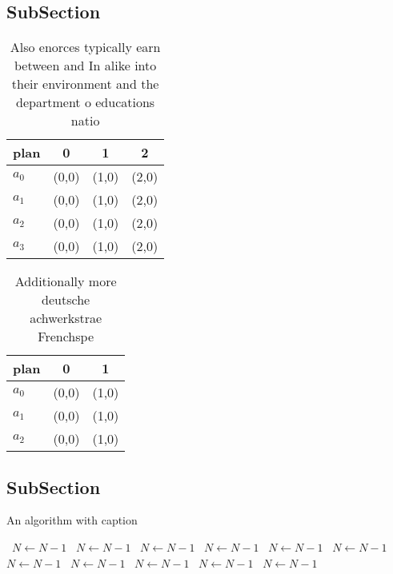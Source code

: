 \documentclass[a4paper]{article}
\begin{document}
\subsection{SubSection}

\begin{table}
\begin{adjustbox}{width=0.9\columnwidth}
\begin{tabular}{|l|l|l|l|}
\hline
\textbf{plan} & \multicolumn{1}{c|}{\textbf{0}} & \multicolumn{1}{c|}{\textbf{1}} & \multicolumn{1}{c|}{\textbf{2}} \\ \hline
\textbf{$a_0$}  & (0,0) & (1,0) & (2,0) \\ \hline
\textbf{$a_1$}  & (0,0) & (1,0) & (2,0) \\ \hline
\textbf{$a_2$}  & (0,0) & (1,0) & (2,0) \\ \hline
\textbf{$a_3$}  & (0,0) & (1,0) & (2,0) \\ \hline
\end{tabular}
\end{adjustbox}
\caption{Also enorces typically earn between and In alike into their environment and the department o educations natio
}
\end{table}

\begin{table}
\begin{adjustbox}{width=1\columnwidth}
\begin{tabular}{|l|l|l|}
\hline
\textbf{plan} & \multicolumn{1}{c|}{\textbf{0}} & \multicolumn{1}{c|}{\textbf{1}} \\ \hline
\textbf{$a_0$}  & (0,0) & (1,0) \\ \hline
\textbf{$a_1$}  & (0,0) & (1,0) \\ \hline
\textbf{$a_2$}  & (0,0) & (1,0) \\ \hline
\end{tabular}
\end{adjustbox}
\caption{Additionally more deutsche achwerkstrae Frenchspe
}
\end{table}

\subsection{SubSection}

\begin{algorithm}
\caption{An algorithm with caption}
\begin{algorithmic}
\    \State $N \gets N - 1$
\    \State $N \gets N - 1$
\    \State $N \gets N - 1$
\    \State $N \gets N - 1$
\    \State $N \gets N - 1$
\    \State $N \gets N - 1$
\    \State $N \gets N - 1$
\    \State $N \gets N - 1$
\    \State $N \gets N - 1$
\    \State $N \gets N - 1$
\    \State $N \gets N - 1$
\EndWhile
\end{algorithmic}
\end{algorithm}
\end{document}
